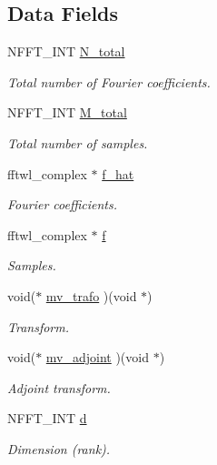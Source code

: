 \subsection*{Data Fields}
\begin{DoxyCompactItemize}
\item 
N\-F\-F\-T\-\_\-\-I\-N\-T \hyperlink{structnfftl__plan_a6e280dc31ae95edc9f5e548d83c939b2}{N\-\_\-total}
\begin{DoxyCompactList}\small\item\em Total number of Fourier coefficients. \end{DoxyCompactList}\item 
N\-F\-F\-T\-\_\-\-I\-N\-T \hyperlink{structnfftl__plan_a7e4456eca1d77610cadfa50c0eca6d98}{M\-\_\-total}
\begin{DoxyCompactList}\small\item\em Total number of samples. \end{DoxyCompactList}\item 
fftwl\-\_\-complex $\ast$ \hyperlink{structnfftl__plan_ad5cf4ad0369bdaf07f6acd801e6b9e5e}{f\-\_\-hat}
\begin{DoxyCompactList}\small\item\em Fourier coefficients. \end{DoxyCompactList}\item 
fftwl\-\_\-complex $\ast$ \hyperlink{structnfftl__plan_a53b53a1222f4acf29c778b933c9f130e}{f}
\begin{DoxyCompactList}\small\item\em Samples. \end{DoxyCompactList}\item 
void($\ast$ \hyperlink{structnfftl__plan_a0f05caab33b6f473626e74f44356e3fc}{mv\-\_\-trafo} )(void $\ast$)
\begin{DoxyCompactList}\small\item\em Transform. \end{DoxyCompactList}\item 
void($\ast$ \hyperlink{structnfftl__plan_a3d343b79e00dbb8cd4984143a03ddf53}{mv\-\_\-adjoint} )(void $\ast$)
\begin{DoxyCompactList}\small\item\em Adjoint transform. \end{DoxyCompactList}\item 
N\-F\-F\-T\-\_\-\-I\-N\-T \hyperlink{structnfftl__plan_a01bfcdd90c108c461c37f655821e630a}{d}
\begin{DoxyCompactList}\small\item\em Dimension (rank). \end{DoxyCompactList}\item 

\end{DoxyCompactItemize}
